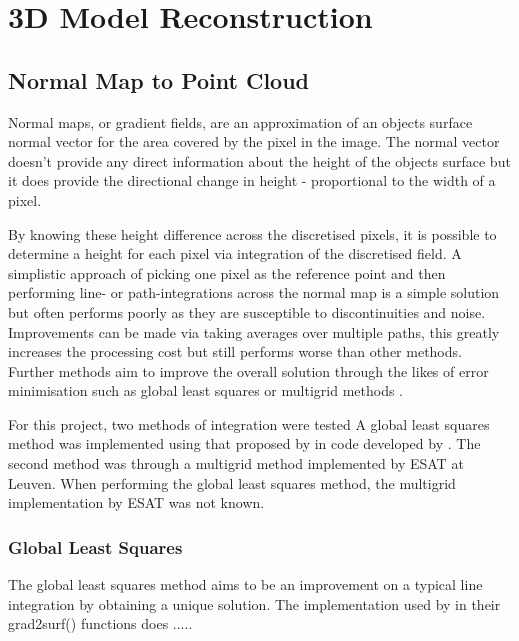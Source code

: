 
\section{3D Model Reconstruction}
\label{sec:ModelReconstruction}

\subsection{Normal Map to Point Cloud}
\label{sec:Normal2Pts}
Normal maps, or gradient fields, are an approximation of an objects surface normal vector for the area covered by the pixel in the image. The normal vector doesn't provide any direct information about the height of the objects surface but it does provide the directional change in height - proportional to the width of a pixel.

By knowing these height difference across the discretised pixels, it is possible to determine a height for each pixel via integration of the discretised field. A simplistic approach of picking one pixel as the reference point and then performing line- or path-integrations across the normal map is a simple solution but often performs poorly as they are susceptible to discontinuities and noise. Improvements can be made via taking averages over multiple paths, this greatly increases the processing cost but still performs worse than other methods. Further methods aim to improve the overall solution through the likes of error minimisation such as global least squares or multigrid methods \cite{SaracchiniEtAl2012}.

For this project, two methods of integration were tested A global least squares method was implemented using that proposed by \cite{HarkerLeary2008} in code developed by \cite{HarkerLeary2013a} . The second method was through a multigrid method implemented by ESAT at Leuven. When performing the global least squares method, the multigrid implementation by ESAT was not known.

\subsubsection{Global Least Squares}
\label{sec:GlobalLeastSquares}
The global least squares method aims to be an improvement on a typical line integration by obtaining a unique solution. The implementation used by \cite{HarkerLeary2008} in their grad2surf() functions does .....

